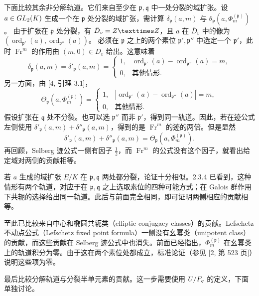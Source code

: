 下面比较其余非分解轨道。它们来自至少在 $\mathfrak p,\mathfrak q$ 中一处分裂的域扩张。设
$a\in GL_2(K)$ 生成一个在 $\mathfrak p$ 处分裂的域扩张，需计算
$\delta_{\mathfrak p}(a,m)$ 与 $\theta_{\mathfrak p}(a,\Phi_m^{(\mathfrak p)})$。
由于扩张在 $\mathfrak p$ 处分裂，有 $\bar D_v=\Z\times\Z$，且 $a$ 在 $\bar D_v$ 中的像为
$(\operatorname{ord}_{\mathfrak p'}(a),\operatorname{ord}_{\mathfrak p''}(a))$。
必须在 $\mathfrak p$ 之上的两个素位 $\mathfrak p',\mathfrak p''$ 中选定一个 $\mathfrak p'$，此时
$\operatorname{Fr}^m$ 的作用由 $(m,0)\in D_v$ 给出。这意味着
\[
\delta_{\mathfrak p}(a,m)=\delta'_{\mathfrak p}(a,m)
=\begin{cases}1,&\operatorname{ord}_{\mathfrak p'}(a)-\operatorname{ord}_{\mathfrak p''}(a)=m,\\
0,&\text{其他情形}.\end{cases}
\]
另一方面，由 [4, 引理 3.1]，
\[
\Theta_{\mathfrak p}(a,\Phi_m^{(\mathfrak p)})
=\begin{cases}1,&|\operatorname{ord}_{\mathfrak p'}(a)-\operatorname{ord}_{\mathfrak p''}(a)|=m,\\
0,&\text{其他情形}.\end{cases}
\]
假设扩张在 $\mathfrak q$ 处不分裂。也可以选 $\mathfrak p''$ 而非 $\mathfrak p'$，得到同一轨道。因此，若在迹公式左侧使用
$\delta'_{\mathfrak p}(a,m)+\delta''_{\mathfrak p}(a,m)$，得到的是
$\operatorname{Fr}^m$ 的迹的两倍。但是显然
\[
\delta'_{\mathfrak p}(a,m)+\delta''_{\mathfrak p}(a,m)
=\Theta_{\mathfrak p}(a,\Phi_m^{(\mathfrak p)}).
\]
再回顾，Selberg 迹公式一侧有因子 $\frac12$，而 $\operatorname{Fr}^m$ 的公式没有这个因子，就看出给定域对两侧的贡献相等。

若 $a$ 生成的域扩张 $E/K$ 在 $\mathfrak p,\mathfrak q$ 两处都分裂，论证十分相似。2.3.4 已看到，这种情形有两个轨道，对应于在 $\mathfrak p,\mathfrak q$ 之上选取素位的四种可能方式；在 Galois 群作用下共轭的选择给出同一轨道。此后与前面完全相同，即可证明两侧相应的贡献相等。

至此已比较来自中心和椭圆共轭类（elliptic conjugacy classes）的贡献。Lefschetz 不动点公式（Lefschetz fixed point formula）一侧没有幺幂类（unipotent class）的贡献，而这些贡献在 Selberg 迹公式中也消失。前面已经指出，$\Phi_m^{(\mathfrak p)}$ 在幺幂类上的轨道积分为零。由于这在两个素位处都成立，标准论证（参见 [2, 第 523 页]）说明这些项为零。

最后比较分解轨道与分裂半单元素的贡献。这一步需要使用 $U/F_q$ 的定义，下面单独讨论。
